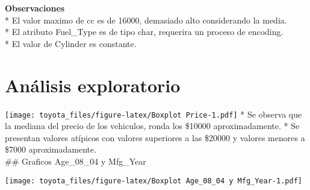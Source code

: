 \documentclass[]{article}
\newenvironment{Shaded}{\begin{snugshade}}{\end{snugshade}}
\newcommand{\DataTypeTok}[1]{\textcolor[rgb]{0.13,0.29,0.53}{#1}}
\newcommand{\DecValTok}[1]{\textcolor[rgb]{0.00,0.00,0.81}{#1}}
\newcommand{\KeywordTok}[1]{\textcolor[rgb]{0.13,0.29,0.53}{\textbf{#1}}}
\newcommand{\NormalTok}[1]{#1}
\newcommand{\OperatorTok}[1]{\textcolor[rgb]{0.81,0.36,0.00}{\textbf{#1}}}
\newcommand{\OtherTok}[1]{\textcolor[rgb]{0.56,0.35,0.01}{#1}}
\newcommand{\StringTok}[1]{\textcolor[rgb]{0.31,0.60,0.02}{#1}}
\begin{document}
\textbf{Observaciones}\\
* El valor maximo de cc es de 16000, demasiado alto considerando la
media.\\
* El atributo Fuel\_Type es de tipo char, requerira un proceso de
encoding.\\
* El valor de Cylinder es constante.

\hypertarget{analisis-exploratorio}{%
\section{Análisis exploratorio}\label{analisis-exploratorio}}

\begin{Shaded}
\end{Shaded}

\texttt{[image: toyota\_files/figure-latex/Boxplot Price-1.pdf]} * Se
observa que la mediana del precio de los vehiculos, ronda los \$10000
aproximadamente. * Se presentan valores atípicos con valores superiores
a las \$20000 y valores menores a \$7000 aproximadamente.\\
\#\# Graficos Age\_08\_04 y Mfg\_Year

\begin{Shaded}
\end{Shaded}

\texttt{[image: toyota\_files/figure-latex/Boxplot Age\_08\_04 y Mfg\_Year-1.pdf]}
\end{document}
